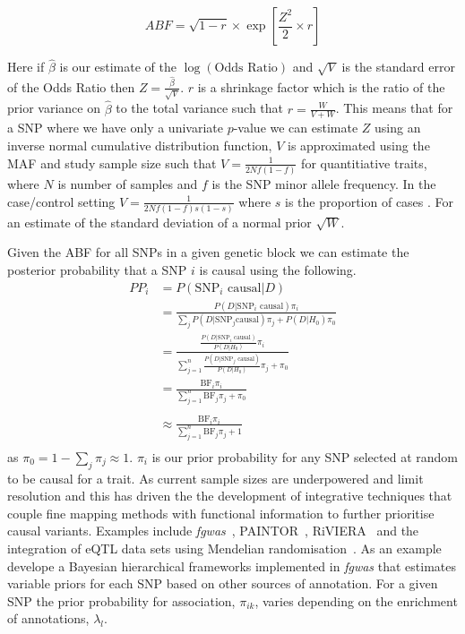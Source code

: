 \documentclass[a4paper,11pt]{report}
\begin{document}
\begin{equation}
	ABF =  \sqrt{1 - r} \times \exp{\left[\frac{Z^{2}}{2} \times r\right]}
\end{equation}

Here if $\hat{\beta}$ is our estimate of the $\log(\text{Odds Ratio})$ and $\sqrt{V}$ is the standard error of the Odds Ratio then  $Z= \frac{\hat{\beta}}{\sqrt{V}}$. $r$ is a shrinkage factor which is the ratio of the prior variance on $\hat{\beta}$ to the total variance such that $r = \frac{W}{V + W}$. This means that for a SNP where we have only a univariate $p$-value we can estimate $Z$ using an inverse normal cumulative distribution function, $V$ is approximated using the MAF and study sample size such that $V=\frac{1}{2Nf(1-f)}$ for quantitiative traits, where $N$ is number of samples and $f$ is the SNP minor allele frequency. In the case/control setting $V=\frac{1}{2Nf(1-f)s(1-s)}$ where $s$ is the proportion of cases . For an estimate of the standard deviation of a normal prior $\sqrt{W}$.

Given the ABF for all SNPs in a given genetic block we can estimate the posterior probability that a SNP $i$  is causal using the following. 
\begin{equation}
\label{form:bf_derivation}
\begin{split}
	PP_{i}& = P(\text{SNP}_{i}\text{ causal} | D)\\
	& = \frac{P(D | \text{SNP}_{i} \text{ causal})\pi_{i}}{\sum_{j}P(D | \text{SNP}_{j}\text{causal})\pi_{j} + P(D | H_{0})\pi_0}\\
	& = \frac{
				\frac{
					P(D | \text{SNP}_{i}\text{ causal})
				}
				{
					P(D|H_{0})
				}\pi_{i}
		}
		{
				\sum_{j=1}^n\frac{
					P(D | \text{SNP}_{j}\text{ causal})
				}
				{
					P(D|H_{0})
				}\pi_{j}  + \pi_0
		}	\\
	& = \frac{
		\text{BF}_{i}\pi_{i}
	}
	{
	\sum_{j=1}^n\text{BF}_{j}\pi_{j} + \pi_{0}
	} \\	
	\\
	& \approx \frac{
		\text{BF}_{i}\pi_{i}
	}
	{
	\sum_{j=1}^n\text{BF}_{j}\pi_{j} + 1
	} \\
\end{split}
\end{equation}
as $\pi_{0} = 1-\sum_{j}\pi_{j} \approx 1$. $\pi_{i}$ is our prior probability for any SNP selected at random to be causal for a trait. As current sample sizes are underpowered and limit resolution and this has driven the the development of integrative techniques that couple fine mapping methods with functional information to further prioritise causal variants. Examples include \textit{fgwas}~\citep{Pickrell2014-xs}, PAINTOR~\citep{KichaevYangLindstromEtAl2014}, RiVIERA~\citep{LiKellis2016}   and the integration of eQTL data sets using Mendelian randomisation~\citep{ZhuZhangHuEtAl2016}. As an example ~\citet{Pickrell2014-xs} develope a Bayesian hierarchical frameworks implemented in \textit{fgwas} that estimates variable priors for each SNP based on other sources of annotation. For a given SNP the prior probability for association, $\pi_{ik}$, varies depending on the enrichment of annotations, $\lambda_{l}$. 
\end{document}
